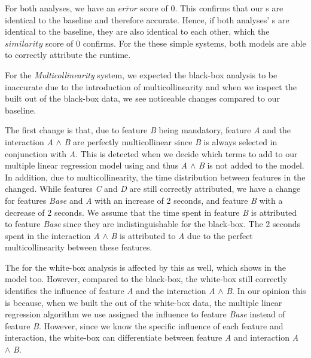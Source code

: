 For both analyses, we have an $\overline{error}$ score of $0$. This confirms that our {\perfInfluenceModel}s are identical to the baseline and
therefore accurate. Hence, if both analyses' {\perfInfluenceModel}s are identical to the baseline, they are also identical to each other,
which the $\overline{similarity}$ score of $0$ confirms. 
For the these simple systems, both models are able to correctly attribute the runtime.

For the \emph{Multicollinearity} system, we expected the black-box analysis to be inaccurate due to the introduction of multicollinearity
and when we inspect the {\perfInfluenceModel} built out of the black-box data, we see noticeable changes compared to our baseline.

The first change is that, due to feature \emph{B} being mandatory,
feature \emph{A} and the interaction \emph{A} $\land$ \emph{B} are perfectly multicollinear since \emph{B}
is always selected in conjunction with \emph{A}.
This is detected when we decide which terms to add to our multiple linear regression model using 
and thus \emph{A} $\land$ \emph{B} is not added to the model. In addition, due to multicollinearity, the time distribution between features in the
{\perfInfluenceModel} changed. While features \emph{C} and \emph{D} are still correctly attributed,
we have a change for features \emph{Base} and \emph{A} with an increase of 2 seconds,
and feature \emph{B} with a decrease of 2 seconds.
We assume that the time spent in feature \emph{B} is attributed to feature \emph{Base}
since they are indistinguishable for the black-box.
The 2 seconds spent in the interaction \emph{A} $\land$ \emph{B} is attributed to \emph{A} due to the perfect multicollinearity 
between these features. 

The {\perfInfluenceModel} for the white-box analysis is affected by this as well, which shows in the model too.
However, compared to the black-box, the white-box still correctly identifies the influence of feature \emph{A} and
the interaction \emph{A} $\land$ \emph{B}. In our opinion this is because, when we built the {\perfInfluenceModel} out of the white-box data,
the multiple linear regression algorithm we use assigned the influence to feature \emph{Base} instead of feature \emph{B}.
However, since we know the specific influence of each feature and interaction,
the white-box can differentiate between feature \emph{A} and interaction \emph{A} $\land$ \emph{B}.


